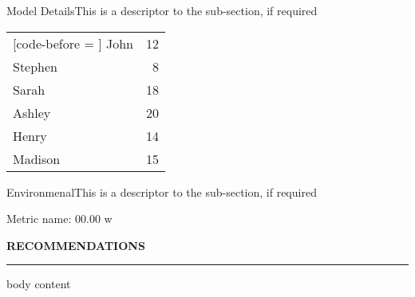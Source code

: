 \documentclass[12pt]{article}
\begin{document}
\begin{multicols*}{2}

\begin{sectiontitle}{Model Details}{This is a descriptor to the sub-section, if required}
\end{sectiontitle}

\begin{NiceTabular}{lr}[code-before = ]
John & 12 \\
Stephen & 8 \\
Sarah & 18 \\
Ashley & 20 \\
Henry & 14 \\
Madison & 15
\end{NiceTabular}

\begin{sectiontitle}{Environmenal}{This is a descriptor to the sub-section, if required}
\end{sectiontitle}

\begin{metricbar}
\textnormal{\small{Metric name:}} \textnormal{\large{00.00}} \textnormal{\small{w}}
\end{metricbar}

\begin{sectionbox}
\textbf{\MakeUppercase{Recommendations}}
\vspace{5pt}
\hrule
\tcblower
body content
\end{sectionbox}


\end{multicols*}
\end{document}
